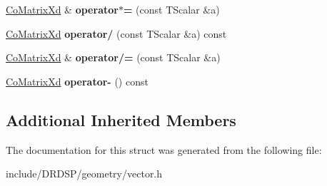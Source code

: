 \begin{DoxyCompactItemize}
\item 
\hypertarget{struct_d_r_d_s_p_1_1_co_matrix_xd_ab91e1d9b3e70567269dc0e62e6b543be}{\hyperlink{struct_d_r_d_s_p_1_1_co_matrix_xd}{Co\-Matrix\-Xd} \& {\bfseries operator$\ast$=} (const T\-Scalar \&a)}\label{struct_d_r_d_s_p_1_1_co_matrix_xd_ab91e1d9b3e70567269dc0e62e6b543be}

\item 
\hypertarget{struct_d_r_d_s_p_1_1_co_matrix_xd_a67332252d8e4c606fb447abd54b530c8}{\hyperlink{struct_d_r_d_s_p_1_1_co_matrix_xd}{Co\-Matrix\-Xd} {\bfseries operator/} (const T\-Scalar \&a) const }\label{struct_d_r_d_s_p_1_1_co_matrix_xd_a67332252d8e4c606fb447abd54b530c8}

\item 
\hypertarget{struct_d_r_d_s_p_1_1_co_matrix_xd_a22bc6ca0a774f3293d1966920811d7f4}{\hyperlink{struct_d_r_d_s_p_1_1_co_matrix_xd}{Co\-Matrix\-Xd} \& {\bfseries operator/=} (const T\-Scalar \&a)}\label{struct_d_r_d_s_p_1_1_co_matrix_xd_a22bc6ca0a774f3293d1966920811d7f4}

\item 
\hypertarget{struct_d_r_d_s_p_1_1_co_matrix_xd_a1e42a1ba60c5b98496c7c1764cbb7686}{\hyperlink{struct_d_r_d_s_p_1_1_co_matrix_xd}{Co\-Matrix\-Xd} {\bfseries operator-\/} () const }\label{struct_d_r_d_s_p_1_1_co_matrix_xd_a1e42a1ba60c5b98496c7c1764cbb7686}

\end{DoxyCompactItemize}
\subsection*{Additional Inherited Members}


The documentation for this struct was generated from the following file\-:\begin{DoxyCompactItemize}
\item 
include/\-D\-R\-D\-S\-P/geometry/vector.\-h\end{DoxyCompactItemize}
